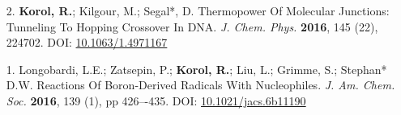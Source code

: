 \begin{enumerate}
	\item[2.] \textbf{Korol, R.}; Kilgour,  M.; Segal*, D. Thermopower Of Molecular Junctions: Tunneling To Hopping Crossover In DNA. \textit{J. Chem. Phys.} \textbf{2016}, 145 (22), 224702. DOI: \href{http://aip.scitation.org/doi/abs/10.1063/1.4971167}{10.1063/1.4971167}
\vspace{-0.2cm}

	\item[1.] Longobardi, L.E.; Zatsepin, P.; \textbf{Korol, R.}; Liu, L.; Grimme, S.; Stephan* D.W. Reactions Of Boron-Derived Radicals With Nucleophiles. \textit{J. Am. Chem. Soc.} \textbf{2016}, 139 (1), pp 426–-435. DOI: \href{http://pubs.acs.org/doi/abs/10.1021/jacs.6b11190}{10.1021/jacs.6b11190}
\end{enumerate}